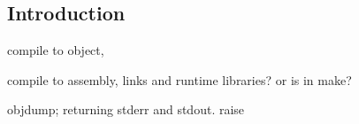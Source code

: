 
\subsection{Introduction}

compile to object, 

compile to assembly, links and runtime libraries? or is in make?

objdump; returning stderr and stdout. raise


